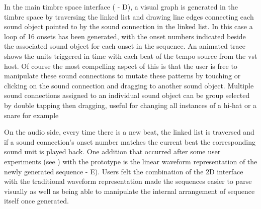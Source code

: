 In the main timbre space interface ( - D), a visual graph is generated in the timbre space by traversing the linked list and drawing line edges connecting each sound object pointed to by the sound connection in the linked list. In this case a loop of 16 onsets has been generated, with the onset numbers indicated beside the associated sound object for each onset in the sequence. An animated trace shows the units triggered in time with each beat of the tempo source from the \acrshort{vst} host. Of course the most compelling aspect of this is that the user is free to manipulate these sound connections to mutate these patterns by touching or clicking on the sound connection and dragging to another sound object. Multiple sound connections assigned to an individual sound object can be group selected by double tapping then dragging, useful for changing all instances of a hi-hat or a snare for example

On the audio side, every time there is a new beat, the linked list is traversed and if a sound connection's onset number matches the current beat the corresponding sound unit is played back. One addition that occurred after some user experiments (see ) with the prototype is the linear waveform representation of the newly generated sequence  - E). Users felt the combination of the 2D interface with the traditional waveform representation made the sequences easier to parse visually as well as being able to manipulate the internal arrangement of sequence itself once generated.

%
